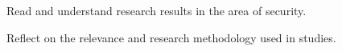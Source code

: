\item Read and understand research results in the area of security.
\item Reflect on the relevance and research methodology used in studies.
